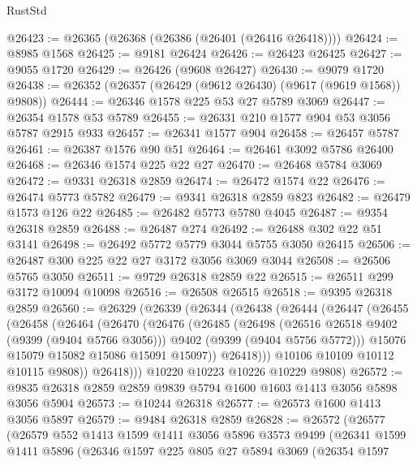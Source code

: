 \begin{lexlean}{RustStd}
\begin{coremodule}
@26423 := @26365 (@26368 (@26386 (@26401 (@26416 @26418))))
@26424 := @8985 @1568
@26425 := @9181 @26424
@26426 := @26423 @26425
@26427 := @9055 @1720
@26429 := @26426 (@9608 @26427)
@26430 := @9079 @1720
@26438 := @26352 (@26357 (@26429 (@9612 @26430) (@9617 (@9619 @1568)) @9808))
@26444 := @26346 @1578 @225 @53 @27 @5789 @3069
@26447 := @26354 @1578 @53 @5789
@26455 := @26331 @210 @1577 @904 @53 @3056 @5787 @2915 @933
@26457 := @26341 @1577 @904
@26458 := @26457 @5787
@26461 := @26387 @1576 @90 @51
@26464 := @26461 @3092 @5786 @26400
@26468 := @26346 @1574 @225 @22 @27
@26470 := @26468 @5784 @3069
@26472 := @9331 @26318 @2859
@26474 := @26472 @1574 @22
@26476 := @26474 @5773 @5782
@26479 := @9341 @26318 @2859 @823
@26482 := @26479 @1573 @126 @22
@26485 := @26482 @5773 @5780 @4045
@26487 := @9354 @26318 @2859
@26488 := @26487 @274
@26492 := @26488 @302 @22 @51 @3141
@26498 := @26492 @5772 @5779 @3044 @5755 @3050 @26415
@26506 := @26487 @300 @225 @22 @27 @3172 @3056 @3069 @3044
@26508 := @26506 @5765 @3050
@26511 := @9729 @26318 @2859 @22
@26515 := @26511 @299 @3172 @10094 @10098
@26516 := @26508 @26515
@26518 := @9395 @26318 @2859
@26560 := @26329
    (@26339
      (@26344
        (@26438
          (@26444
            (@26447
              (@26455
                (@26458
                  (@26464
                    (@26470
                      (@26476
                        (@26485
                          (@26498
                            (@26516 @26518 @9402 (@9399 (@9404 @5766 @3056)))
                            @9402
                            (@9399 (@9404 @5756 @5772)))
                          @15076
                          @15079
                          @15082
                          @15086
                          @15091
                          @15097))
                      @26418)))
                @10106
                @10109
                @10112
                @10115
                @9808))
            @26418)))
      @10220
      @10223
      @10226
      @10229
      @9808)
@26572 := @9835 @26318 @2859 @2859 @9839 @5794 @1600 @1603 @1413 @3056 @5898 @3056 @5904
@26573 := @10244 @26318
@26577 := @26573 @1600 @1413 @3056 @5897
@26579 := @9484 @26318 @2859
@26828 := @26572
    (@26577
      (@26579
        @552
        @1413
        @1599
        @1411
        @3056
        @5896
        @3573
        @9499
        (@26341
          @1599
          @1411
          @5896
          (@26346
            @1597
            @225
            @805
            @27
            @5894
            @3069
            (@26354
              @1597

\end{coremodule}
\end{lexlean}
